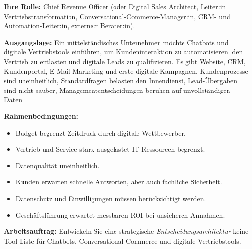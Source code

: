 \documentclass[11pt,a4paper,oneside]{article}
\begin{document}
\begin{infobox}
\textbf{Ihre Rolle:} Chief Revenue Officer (oder Digital Sales Architect, Leiter:in Vertriebstransformation, Conversational-Commerce-Manager:in, CRM- und Automation-Leiter:in, externe:r Berater:in).

\smallskip
\textbf{Ausgangslage:} Ein mittelständisches Unternehmen möchte Chatbots und digitale Vertriebstools einführen, um Kundeninteraktion zu automatisieren, den Vertrieb zu entlasten und digitale Leads zu qualifizieren. Es gibt Website, CRM, Kundenportal, E-Mail-Marketing und erste digitale Kampagnen. Kundenprozesse sind uneinheitlich, Standardfragen belasten den Innendienst, Lead-Übergaben sind nicht sauber, Managemententscheidungen beruhen auf unvollständigen Daten.

\smallskip
\textbf{Rahmenbedingungen:}
\begin{itemize}
  \item Budget begrenzt \textperiodcentered{} Zeitdruck durch digitale Wettbewerber.
  \item Vertrieb und Service stark ausgelastet \textperiodcentered{} IT-Ressourcen begrenzt.
  \item Datenqualität uneinheitlich.
  \item Kunden erwarten schnelle Antworten, aber auch fachliche Sicherheit.
  \item Datenschutz und Einwilligungen müssen berücksichtigt werden.
  \item Geschäftsführung erwartet messbaren ROI \textendash{} bei unsicheren Annahmen.
\end{itemize}
\end{infobox}

\noindent\textbf{Arbeitsauftrag:} Entwickeln Sie eine strategische \emph{Entscheidungsarchitektur} \textendash{} keine Tool-Liste \textendash{} für Chatbots, Conversational Commerce und digitale Vertriebstools.
\end{document}
